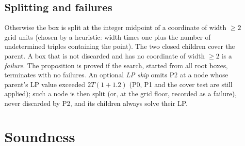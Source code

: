 \documentclass[11pt]{amsart}
\theoremstyle{definition}
\begin{document}
\subsection{Splitting and failures}
Otherwise the box is split at the integer midpoint of a coordinate of width $\ge 2$ grid units (chosen by a heuristic: width times one plus the number of undetermined triples containing the point). The two closed children cover the parent. A box that is not discarded and has no coordinate of width $\ge 2$ is a \emph{failure}. The proposition is proved if the search, started from all root boxes, terminates with no failures. %
An optional \emph{LP skip} omits P2 at a node whose parent's LP value exceeded $2T(1+1.2)$ (P0, P1 and the cover test are still applied); such a node is then split (or, at the grid floor, recorded as a failure), never discarded by P2, and its children always solve their LP. %

\section{Soundness}\label{sec:sound}
\end{document}

